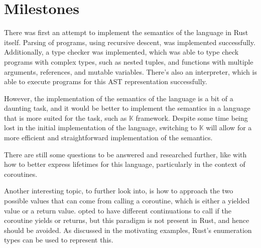 \documentclass[review,twocolumn,preprint]{sigplanconf}
\begin{document}


\section{Milestones}

There was first an attempt to implement the semantics of the language in Rust itself. Parsing of programs, using recursive descent, was implemented successfully. Additionally, a type checker was implemented, which was able to type check programs with complex types, such as nested tuples, and functions with multiple arguments, references, and mutable variables. There's also an interpreter, which is able to execute programs for this AST representation successfully.

However, the implementation of the semantics of the language is a bit of a daunting task, and it would be better to implement the semantics in a language that is more suited for the task, such as $\mathbb{K}$ framework. Despite some time being lost in the initial implementation of the language, switching to $\mathbb{K}$ will allow for a more efficient and straightforward implementation of the semantics.

There are still some questions to be answered and researched further, like with how to better express lifetimes for this language, particularly in the context of coroutines.

Another interesting topic, to further look into, is how to approach the two possible values that can come from calling a coroutine, which is either a yielded value or a return value. \citet{konrad2011} opted to have different continuations to call if the coroutine yields or returns, but this paradigm is not present in Rust, and hence should be avoided. As discussed in the motivating examples, Rust's enumeration types can be used to represent this.


\end{document}
